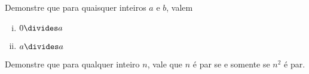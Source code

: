 \begin{exercise}
%
	Demonstre que para quaisquer inteiros $a$ e $b$, valem
	\begin{enumerate}[(i)]
	\item $0 \divides a$
	\item $a \divides a$
	\end{enumerate}
\end{exercise}

\begin{exercise}
%
	Demonstre que para qualquer inteiro $n$, vale que $n$ é par se e somente se $n^2$ é par.
\end{exercise}
